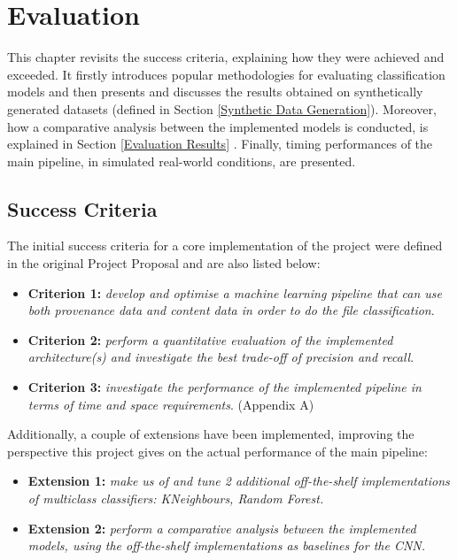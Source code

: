 

\chapter{Evaluation}

This chapter revisits the success criteria, explaining how they were achieved and exceeded. It firstly introduces popular methodologies for evaluating classification models and then presents and discusses the results obtained on synthetically generated datasets (defined in Section \ref{Synthetic Data Generation}). Moreover, how a comparative analysis between the implemented models is conducted, is explained in Section \ref{Evaluation Results} . Finally, timing performances of the main pipeline, in simulated real-world conditions, are presented. \\

\section{Success Criteria}

The initial success criteria for a core implementation of the project were defined in the original Project Proposal and are also listed below:

\begin{itemize}
  \item \textbf{Criterion 1:} \textit{develop and optimise a machine learning pipeline that can use both provenance data and content data in order to do the file classification}. \greencheck

  \item \textbf{Criterion 2:} \textit{perform a quantitative evaluation of the implemented architecture(s) and investigate the best trade-off of precision and recall}. \greencheck

  \item \textbf{Criterion 3:} \textit{investigate the performance of the implemented pipeline in terms of time and space requirements}. (Appendix A) \greencheck

\end{itemize}

Additionally, a couple of extensions have been implemented, improving the perspective this project gives on the actual performance of the main pipeline:

\begin{itemize}
  \item \textbf{Extension 1:} \textit{make us of and tune 2 additional off-the-shelf implementations of multiclass classifiers: KNeighbours, Random Forest.} \greencheck

  \item \textbf{Extension 2:} \textit{perform a comparative analysis between the implemented models, using the off-the-shelf implementations as baselines for the CNN.} \greencheck

\end{itemize}


